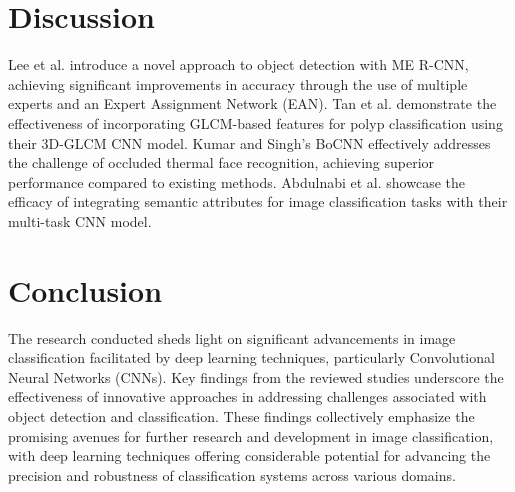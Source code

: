 \documentclass[journal]{IEEEtran}
\begin{document}
\section{Discussion}
Lee et al. \cite{lee2020me} introduce a novel approach to object detection with ME R-CNN, achieving significant improvements in accuracy through the use of multiple experts and an Expert Assignment Network (EAN). Tan et al. \cite{tan20203d} demonstrate the effectiveness of incorporating GLCM-based features for polyp classification using their 3D-GLCM CNN model. Kumar and Singh's BoCNN \cite{kumar2020occluded} effectively addresses the challenge of occluded thermal face recognition, achieving superior performance compared to existing methods. Abdulnabi et al. \cite{abdulnabi2015multi} showcase the efficacy of integrating semantic attributes for image classification tasks with their multi-task CNN model.

\section{Conclusion}
The research conducted sheds light on significant advancements in image classification facilitated by deep learning techniques, particularly Convolutional Neural Networks (CNNs). Key findings from the reviewed studies underscore the effectiveness of innovative approaches in addressing challenges associated with object detection and classification. These findings collectively emphasize the promising avenues for further research and development in image classification, with deep learning techniques offering considerable potential for advancing the precision and robustness of classification systems across various domains.
\end{document}
